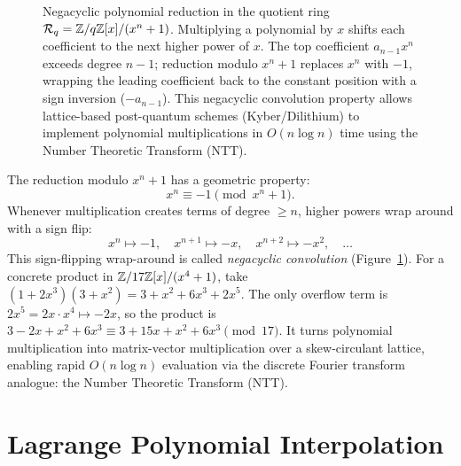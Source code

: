 \begin{figure}[H]
\caption{Negacyclic polynomial reduction in the quotient ring $\mathcal{R}_q = \mathbb{Z}/q\mathbb{Z}[x]/(x^n+1)$. Multiplying a polynomial by $x$ shifts each coefficient to the next higher power of $x$. The top coefficient $a_{n-1} x^n$ exceeds degree $n-1$; reduction modulo $x^n+1$ replaces $x^n$ with $-1$, wrapping the leading coefficient back to the constant position with a sign inversion ($-a_{n-1}$). This negacyclic convolution property allows lattice-based post-quantum schemes (Kyber/Dilithium) to implement polynomial multiplications in $O(n \log n)$ time using the Number Theoretic Transform (NTT).}
\label{ch40:fig-quotient-ring}
\end{figure}

The reduction modulo $x^n + 1$ has a geometric property:
\[
  x^n \equiv -1 \pmod{x^n + 1}.
\]
Whenever multiplication creates terms of degree $\ge n$, higher powers wrap around with a sign flip:
\[
  x^n \mapsto -1, \quad x^{n+1} \mapsto -x, \quad x^{n+2} \mapsto -x^2, \quad \dots
\]
This sign-flipping wrap-around is called \emph{negacyclic convolution} (Figure~\ref{ch40:fig-quotient-ring}).
For a concrete product in $\mathbb{Z}/17\mathbb{Z}[x]/(x^4+1)$, take $(1 + 2x^3)(3 + x^2) = 3 + x^2 + 6x^3 + 2x^5$.
The only overflow term is $2x^5 = 2x\cdot x^4 \mapsto -2x$, so the product is
$3 - 2x + x^2 + 6x^3 \equiv 3 + 15x + x^2 + 6x^3 \pmod{17}$.
It turns polynomial multiplication into matrix-vector multiplication over a skew-circulant lattice,
enabling rapid $O(n \log n)$ evaluation via the discrete Fourier transform analogue: the Number
Theoretic Transform (NTT).

\section{Lagrange Polynomial Interpolation}
\label{ch40:lagrange}

